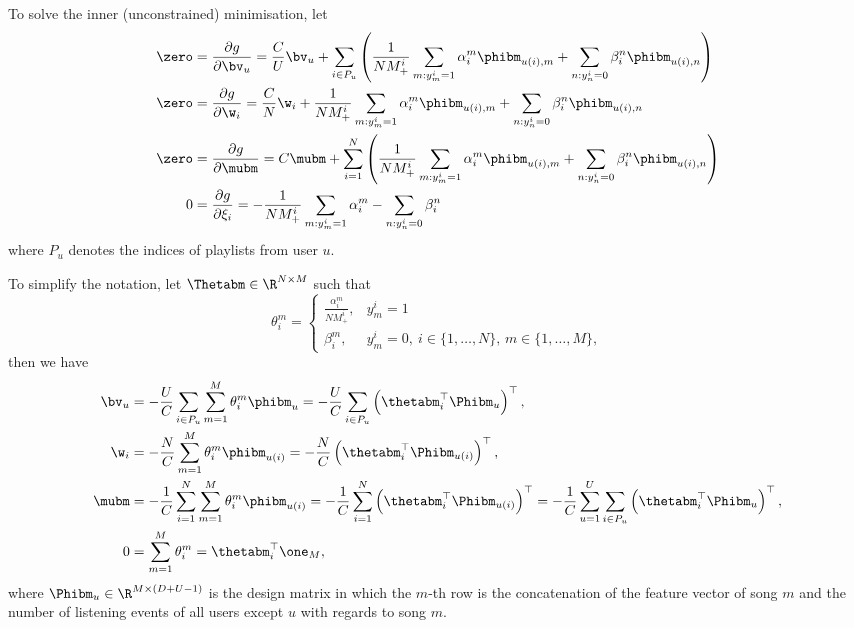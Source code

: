 To solve the inner (unconstrained) minimisation, let
\begin{equation*}
\begin{aligned}
\zero 
&= \frac{\partial g}{\partial \bv_u} 
 = \frac{C}{U} \bv_u 
   + \sum_{i \in P_u} \left( \frac{1}{N M_+^i} \sum_{m: y_m^i = 1} \alpha_i^m \phibm_{u(i),m} + \sum_{n: y_n^i = 0} \beta_i^n \phibm_{u(i),n} \right) \\
%
\zero 
&= \frac{\partial g}{\partial \w_i}
 = \frac{C}{N} \w_i + \frac{1}{N M_+^i} \sum_{m: y_m^i = 1} \alpha_i^m \phibm_{u(i),m} + \sum_{n: y_n^i = 0} \beta_i^n \phibm_{u(i),n} \\
%
\zero 
&= \frac{\partial g}{\partial \mubm} 
 = C \mubm 
   + \sum_{i=1}^N \left( \frac{1}{N M_+^i} \sum_{m: y_m^i = 1} \alpha_i^m \phibm_{u(i),m} + \sum_{n: y_n^i = 0} \beta_i^n \phibm_{u(i),n} \right) \\
%
0
&= \frac{\partial g}{\partial \xi_i}
 = - \frac{1}{N M_+^i} \sum_{m: y_m^i = 1} \alpha_i^m - \sum_{n: y_n^i = 0} \beta_i^n
\end{aligned}
\end{equation*}
where $P_u$ denotes the indices of playlists from user $u$.

To simplify the notation, let $\Thetabm \in \R^{N \times M}$ such that
\begin{equation*}
\theta_i^m = 
\begin{cases}
    \frac{\alpha_i^m}{N M_+^i}, & y_m^i = 1 \\
    \beta_i^m, & y_m^i = 0, \ i \in \{1,\dots,N\}, \, m \in \{1,\dots,M\},
\end{cases}
\end{equation*}
then we have
\begin{equation}
\label{eq:dual2primal}
\begin{aligned}
\bv_u
&= -\frac{U}{C} \sum_{i \in P_u} \sum_{m=1}^M \theta_i^m \phibm_u
 = -\frac{U}{C} \sum_{i \in P_u} \left( \thetabm_i^\top \Phibm_u \right)^\top, \\
%
\w_i  
&= -\frac{N}{C} \sum_{m=1}^M \theta_i^m \phibm_{u(i)}
 = -\frac{N}{C} \left( \thetabm_i^\top \Phibm_{u(i)} \right)^\top, \\
%
\mubm
&= -\frac{1}{C} \sum_{i=1}^N \sum_{m=1}^M \theta_i^m \phibm_{u(i)}
 = -\frac{1}{C} \sum_{i=1}^N \left( \thetabm_i^\top \Phibm_{u(i)} \right)^\top
 = -\frac{1}{C} \sum_{u=1}^U \sum_{i \in P_u} \left( \thetabm_i^\top \Phibm_u \right)^\top, \\
%
0
&= \sum_{m=1}^M \theta_i^m
 = \thetabm_i^\top \one_M,
\end{aligned}
\end{equation}
where $\Phibm_u \in \R^{M \times (D + U - 1)}$ is the design matrix in which 
the $m$-th row is the concatenation of the feature vector of song $m$ 
and the number of listening events of all users except $u$ with regards to song $m$.

